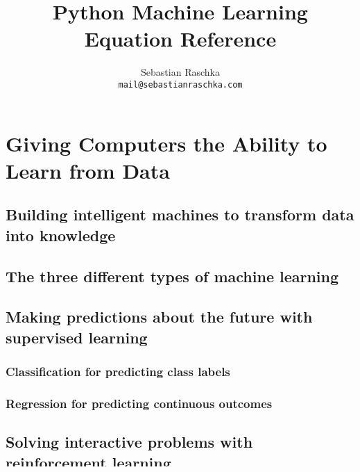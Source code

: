\documentclass[letterpaper]{report}
\title{Python Machine Learning\\ Equation Reference}
\author{Sebastian Raschka \\ \texttt{mail@sebastianraschka.com}}
\date{ \vspace{2cm} 05\slash 04\slash 2015 (last updated: 06\slash 19\slash 2016) \\\begin{flushleft} \vspace{2cm}  \noindent\rule{10cm}{0.4pt} \\ Code Repository and Resources:: \href{https://github.com/rasbt/python-machine-learning-book}{https://github.com/rasbt/python-machine-learning-book} \vspace{2cm} \endgraf @book\{raschka2015python,\\
  title=\{Python Machine Learning\},\\
  author=\{Raschka, Sebastian\},\\
  year=\{2015\},\\
  publisher=\{Packt Publishing\} \} \end{flushleft}}
\begin{document}
 

\maketitle


\tableofcontents





\chapter{Giving Computers the Ability to Learn from Data}

\section{Building intelligent machines to transform data into knowledge}
\section{The three different types of machine learning}
\section{Making predictions about the future with supervised learning}
\subsection{Classification for predicting class labels}
\subsection{Regression for predicting continuous outcomes}
\section{Solving interactive problems with reinforcement learning}
\section{Discovering hidden structures with unsupervised learning}
\subsection{Finding subgroups with clustering}
\subsection{Dimensionality reduction for data compression}
\end{document}
